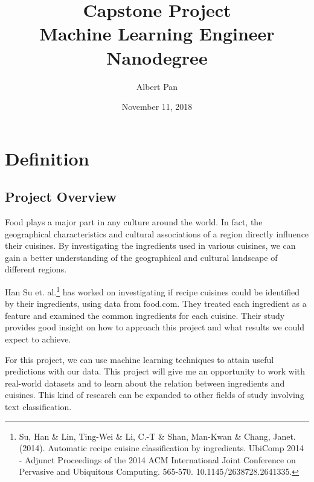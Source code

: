 \documentclass[12pt]{article}
\newcommand{\cnum}{\textbf{Capstone Project}}
\newcommand{\ctitle}[3]{\title{\vspace{-0.5in}\cnum\\#2\vspace{-1ex}}}
\begin{document}
\ctitle{0}{Machine Learning Engineer Nanodegree}{}
\author{Albert Pan}
\date{\vspace{-2ex}November 11, 2018}
\maketitle

\section{Definition}
\subsection{Project Overview}

Food plays a major part in any culture around the world. In fact, the geographical characteristics and cultural associations of a region directly influence their cuisines. By investigating the ingredients used in various cuisines, we can gain a better understanding of the geographical and cultural landscape of different regions.

Han Su et. al.\footnote{Su, Han \& Lin, Ting-Wei \& Li, C.-T \& Shan, Man-Kwan \& Chang, Janet. (2014). Automatic recipe cuisine classification by ingredients. UbiComp 2014 - Adjunct Proceedings of the 2014 ACM International Joint Conference on Pervasive and Ubiquitous Computing. 565-570. 10.1145/2638728.2641335.} has worked on investigating if recipe cuisines could be identified by their ingredients, using data from food.com. They treated each ingredient as a feature and examined the common ingredients for each cuisine. Their study provides good insight on how to approach this project and what results we could expect to achieve.

For this project, we can use machine learning techniques to attain useful predictions with our data. This project will give me an opportunity to work with real-world datasets and to learn about the relation between ingredients and cuisines. This kind of research can be expanded to other fields of study involving text classification.
\end{document}
